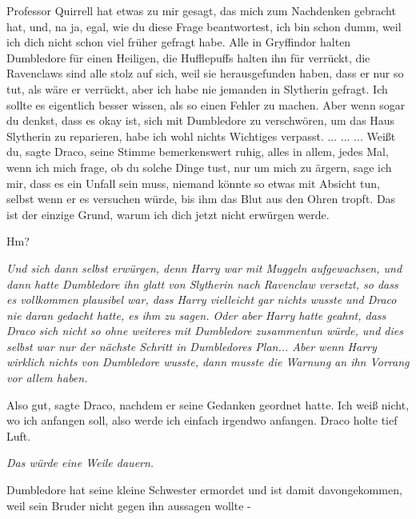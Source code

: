 \glqq Professor Quirrell hat etwas zu mir gesagt, das mich zum Nachdenken
gebracht hat, und, na ja, egal, wie du diese Frage beantwortest, ich bin schon
dumm, weil ich dich nicht schon viel früher gefragt habe. Alle in Gryffindor
halten Dumbledore für einen Heiligen, die Hufflepuffs halten ihn für verrückt,
die Ravenclaws sind alle stolz auf sich, weil sie herausgefunden haben, dass er
nur so tut, als wäre er verrückt, aber ich habe nie jemanden in Slytherin
gefragt. Ich sollte es eigentlich besser wissen, als so einen Fehler zu machen.
Aber wenn sogar du denkst, dass es okay ist, sich mit Dumbledore zu verschwören,
um das Haus Slytherin zu reparieren, habe ich wohl nichts Wichtiges
verpasst.\grqq{} ... ... ... \glqq Weißt du\grqq{}, sagte Draco, seine Stimme
bemerkenswert ruhig, alles in allem, \glqq jedes Mal, wenn ich mich frage, ob du
solche Dinge tust, nur um mich zu ärgern, sage ich mir, dass es ein Unfall sein
muss, niemand könnte so etwas mit Absicht tun, selbst wenn er es versuchen
würde, bis ihm das Blut aus den Ohren tropft. Das ist der einzige Grund, warum
ich dich jetzt nicht erwürgen werde.\grqq{}

\glqq Hm?\grqq{}

\emph{Und sich dann selbst erwürgen, denn Harry war mit Muggeln aufgewachsen, und dann hatte Dumbledore ihn glatt von Slytherin nach Ravenclaw versetzt, so dass es vollkommen plausibel war, dass Harry vielleicht gar nichts wusste und Draco nie daran gedacht hatte, es ihm zu sagen. Oder aber Harry hatte geahnt, dass Draco sich nicht so ohne weiteres mit Dumbledore zusammentun würde, und dies selbst war nur der nächste Schritt in Dumbledores Plan... Aber wenn Harry wirklich nichts von Dumbledore wusste, dann musste die Warnung an ihn Vorrang vor allem haben.}

\glqq Also gut\grqq{}, sagte Draco, nachdem er seine Gedanken geordnet hatte.
\glqq Ich weiß nicht, wo ich anfangen soll, also werde ich einfach irgendwo
anfangen.\grqq{} Draco holte tief Luft.

\emph{Das würde eine Weile dauern. }

\glqq Dumbledore hat seine kleine Schwester ermordet und ist damit
davongekommen, weil sein Bruder nicht gegen ihn aussagen wollte -\grqq{}

